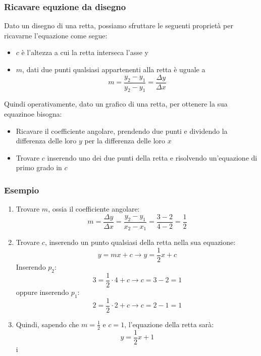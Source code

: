 \subsubsection*{Ricavare equzione da disegno}
Dato un disegno di una retta, possiamo sfruttare le seguenti proprietà per ricavarne l'equazione come segue:
\begin{itemize}
	\item $ c $ è l'altezza a cui la retta interseca l'asse y
	\item $ m $, dati due punti qualsiasi appartenenti alla retta è uguale a
	      \[
		      m = \frac{y_2 - y_1}{y_2 - y_1} = \frac{\Delta y}{ \Delta x}
	      \]
\end{itemize}
Quindi operativamente, dato un grafico di una retta, per ottenere la sua equazinoe bisogna:
\begin{itemize}
	\item Ricavare il coefficiente angolare, prendendo due punti e dividendo la differenza delle loro $ y $ per la differenza delle loro $ x $
	\item Trovare $ c $ inserendo uno dei due punti della retta e risolvendo un'equazione di primo grado in $ c $
\end{itemize}
\subsubsection*{Esempio}

\begin{enumerate}
	\item Trovare $ m $, ossia il coefficiente angolare:
	      \[
		      m= \frac{\Delta y}{\Delta x} = \frac{y_2-y_1}{x_2 - x_1} = \frac{3 - 2}{4 - 2} = \frac{1}{2}
	      \]
	\item Trovare $ c $, inserendo un punto qualsiasi della retta nella sua equazione:
	      \[
		      y= mx + c \rightarrow y = \frac{1}{2}x + c
	      \]
	      Inserendo $ p_2 $:
	      \[
		      3 = \frac{1}{2} \cdot  4 + c \rightarrow c = 3 - 2 = 1
	      \]
	      oppure inserendo $ p_1 $:
	      \[
		      2 = \frac{1}{2} \cdot  2 + c \rightarrow c = 2 - 1 = 1
	      \]
	\item Quindi, sapendo che $ m=\frac{1}{2} $ e $ c = 1 $, l'equazione della retta sarà:
	      \[
		      y = \frac{1}{2}x + 1
	      \]
	      i
\end{enumerate}


